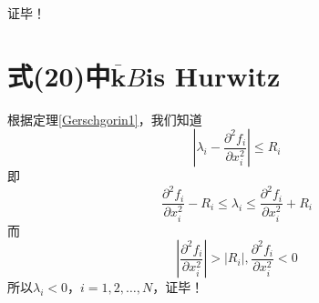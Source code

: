 \documentclass[lang=cn,10pt]{elegantbook}
\newcommand\bv[1]{\boldsymbol{#1}}
\begin{document}
证毕！


\section{式(20)中\texorpdfstring{$\overline{\bv{k}} B$}{防缺字}is Hurwitz}
根据定理\ref{Gerschgorin1}，我们知道
\begin{equation*}
	|\lambda_i - \frac{\partial^2f_i}{\partial x_i^2}| \leq R_i
\end{equation*}
即
\begin{equation*}
	\frac{\partial^2f_i}{\partial x_i^2} - R_i \leq \lambda_i \leq \frac{\partial^2f_i}{\partial x_i^2} + R_i
\end{equation*}
而
\begin{equation*}
	|\frac{\partial^2f_i}{\partial x_i^2}| > |R_i|,\frac{\partial^2f_i}{\partial x_i^2} < 0
\end{equation*}
所以$\lambda_i < 0$，$i = 1, 2,\ldots,N$，证毕！
\end{document}
